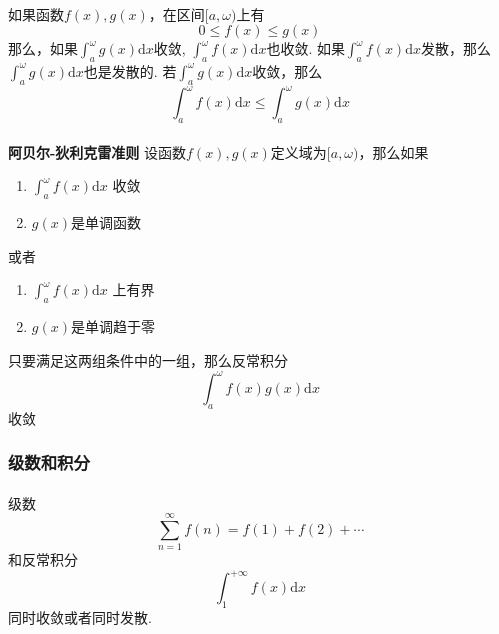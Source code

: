 \paragraph{}
如果函数$f(x), g(x)$，在区间$[a, \omega)$上有
$$
0 \leq f(x) \leq g(x)
$$
那么，如果$\int_a^\omega g(x) \mathrm{d} x$收敛, $\int_a^\omega f(x) \mathrm{d} x$也收敛. 如果$\int_a^\omega f(x) \mathrm{d} x$发散，那么$\int_a^\omega g(x) \mathrm{d} x$也是发散的. 若$\int_a^\omega g(x) \mathrm{d} x$收敛，那么
$$
\int_a^\omega f(x) \mathrm{d} x \leq \int_a^\omega g(x) \mathrm{d} x
$$

\paragraph{}
\textbf{阿贝尔-狄利克雷准则}\: 设函数$f(x), g(x)$定义域为$[a, \omega)$，那么如果
\begin{enumerate}
\item $\int_a^\omega f(x) \mathrm{d} x$ 收敛
\item $g(x)$是单调函数
\end{enumerate}
或者
\begin{enumerate}
\item $\int_a^\omega f(x) \mathrm{d} x$ 上有界
\item $g(x)$是单调趋于零
\end{enumerate}
只要满足这两组条件中的一组，那么反常积分
$$
\int_a^\omega f(x) g(x) \mathrm{d} x
$$
收敛

\subsubsection{级数和积分}
\paragraph{}
级数
$$
\sum_{n = 1}^\infty f(n) = f(1) + f(2) + \cdots 
$$
 和反常积分
 $$
 \int_1^{+\infty} f(x) \mathrm{d} x
 $$
 同时收敛或者同时发散.







